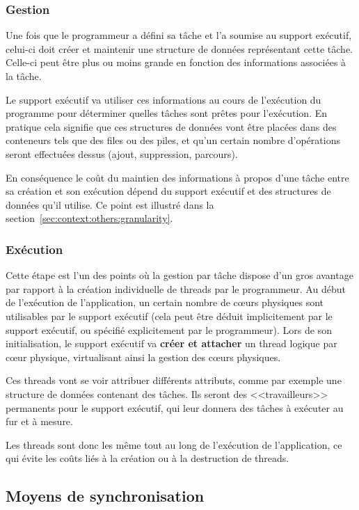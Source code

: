 \subsubsection{Gestion}

Une fois que le programmeur a défini sa tâche et l'a soumise au support exécutif, celui-ci doit créer et maintenir une structure de données représentant cette tâche.
Celle-ci peut être plus ou moins grande en fonction des informations associées à la tâche.

Le support exécutif va utiliser ces informations au cours de l'exécution du programme pour déterminer quelles tâches sont prêtes pour l'exécution.
En pratique cela signifie que ces structures de données vont être placées dans des conteneurs tels que des files ou des piles, et qu'un certain nombre d'opérations seront effectuées dessus (ajout, suppression, parcours).

En conséquence le coût du maintien des informations à propos d'une tâche entre sa création et son exécution dépend du support exécutif et des structures de données qu'il utilise.
Ce point est illustré dans la section~\ref{sec:context:others:granularity}.


\subsubsection{Exécution}

Cette étape est l'un des points où la gestion par tâche dispose d'un gros avantage par rapport à la création individuelle de threads par le programmeur.
Au début de l'exécution de l'application, un certain nombre de cœurs physiques sont utilisables par le support exécutif (cela peut être déduit implicitement par le support exécutif, ou spécifié explicitement par le programmeur).
Lors de son initialisation, le support exécutif va \textbf{créer et attacher} un thread logique par cœur physique, virtualisant ainsi la gestion des cœurs physiques.

Ces threads vont se voir attribuer différents attributs, comme par exemple une structure de données contenant des tâches.
Ils seront des <<travailleurs>> permanents pour le support exécutif, qui leur donnera des tâches à exécuter au fur et à mesure.

Les threads sont donc les même tout au long de l'exécution de l'application, ce qui évite les coûts liés à la création ou à la destruction de threads. 


\subsection{Moyens de synchronisation}

